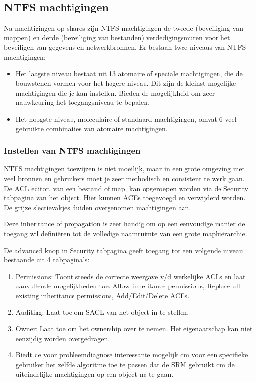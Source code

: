 \subsection{NTFS machtigingen}

Na machtigingen op shares zijn NTFS machtigingen de tweede (beveiliging van
mappen) en derde (beveiliging van bestanden) verdedigingsmuren voor het
beveiligen van gegevens en netwerkbronnen. Er bestaan twee niveaus van NTFS
machtigingen:
\begin{itemize}
	\item Het laagste niveau bestaat uit 13 atomaire of speciale
		machtigingen, die de bouwstenen vormen voor het hogere niveau.
		Dit zijn de kleinst mogelijke machtigingen die je kan instellen.
		Bieden de mogelijkheid om zeer nauwkeuring het toegangsniveau te
		bepalen.
	\item Het hoogste niveau, moleculaire of standaard machtigingen, omvat 6
		veel gebruikte combinaties van atomaire machtigingen.
\end{itemize}

\subsubsection{Instellen van NTFS machtigingen}

NTFS machtigingen toewijzen is niet moeilijk, maar in een grote omgeving met
veel bronnen en gebruikers moet je zeer methodisch en consistent te werk gaan.
De ACL editor, van een bestand of map, kan opgeroepen worden via de Security
tabpagina van het object. Hier kunnen ACEs toegevoegd en verwijderd worden. De
grijze slectievakjes duiden overgenomen machtigingen aan.

Deze inheritance of propagation is zeer handig om op een eenvoudige manier de
toegang wil definiëren tot de volledige naamruimte van een grote maphiërarchie.

De advanced knop in Security tabpagina geeft toegang tot een volgende niveau
bestaande uit 4 tabpagina's:
\begin{enumerate}
	\item Permissions: Toont steeds de correcte weergave v/d werkelijke
		ACLs en laat aanvullende mogelijkheden toe: Allow inheritance
		permissions, Replace all existing inheritance permissions,
		Add/Edit/Delete ACEs.
	\item Auditing: Laat toe om SACL van het object in te stellen.
	\item Owner: Laat toe om het ownership over te nemen. Het eigenaarschap
		kan niet eenzijdig worden overgedragen.
	\item Biedt de voor probleemdiagnose interessante mogelijk om voor een
		specifieke gebruiker het zelfde algoritme toe te passen dat de
		SRM gebruikt om de uiteindelijke machtigingen op een object na
		te gaan.
\end{enumerate}

